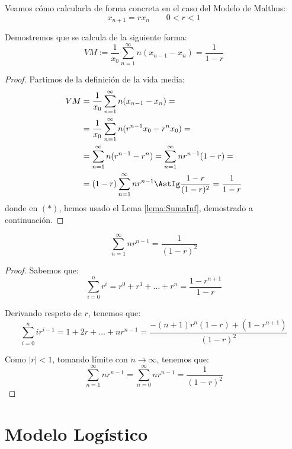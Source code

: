 Veamos cómo calcularla de forma concreta en el caso del Modelo de Malthus:
$$x_{n+1} = rx_n\qquad 0 < r < 1$$

Demostremos que se calcula de la siguiente forma:
$$VM := \dfrac{1}{x_0}\sum_{n = 1}^{\infty} n(x_{n-1}-x_n) = \dfrac{1}{1-r}$$

\begin{proof} Partimos de la definición de la vida media:
    \begin{align*}
        VM &= \dfrac{1}{x_0}\sum_{n = 1}^{\infty} n(x_{n-1}-x_n) =\\&
        = \dfrac{1}{x_0} \sum_{n=1}^\infty n(r^{n-1}x_0 - r^n x_0) =\\&
        = \sum_{n=1}^\infty n(r^{n-1}-r^n) = \sum_{n=1}^\infty nr^{n-1} (1-r)=\\&
        = (1-r) \sum_{n=1}^\infty nr^{n-1} \AstIg \dfrac{1-r}{(1-r)^2}
        = \frac{1}{1-r}
    \end{align*}
    donde en $(\ast)$, hemos usado el Lema \ref{lema:SumaInf}, demostrado a continuación.
\end{proof}

\begin{lema}\label{lema:SumaInf}
    $$\sum_{n=1}^\infty n r^{n-1} = \dfrac{1}{(1-r)^2}$$
\end{lema}
\begin{proof}
    Sabemos que:
    \begin{equation*}
        \sum_{i=0}^n r^i = r^0 + r^1 + \dots + r^n = \frac{1-r^{n+1}}{1-r}
    \end{equation*}

    Derivando respeto de $r$, tenemos que:
    \begin{equation*}
        \sum_{i=0}^{n} ir^{i-1} = 1 + 2r + \dots + nr^{n-1} = \frac{-(n+1)r^{n}(1-r) + (1-r^{n+1})}{(1-r)^2}
    \end{equation*}

    Como $|r|<1$, tomando límite con $n\to \infty$, tenemos que:
    \begin{equation*}
        \sum_{n=1}^\infty nr^{n-1} = \sum_{n=0}^\infty nr^{n-1} = \frac{1}{(1-r)^2}
    \end{equation*}
\end{proof}



\section{Modelo Logístico} \label{sec:IntroModeloLogistico}

